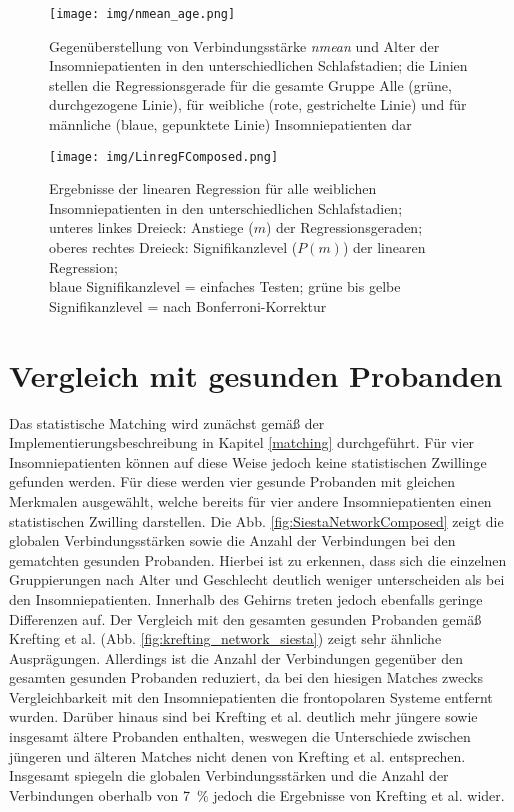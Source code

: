 \begin{figure}[H]
	\centering
	\texttt{[image: img/nmean\_age.png]}
	\caption[Gegenüberstellung von Verbindungsstärke \textit{nmean} und Alter von Insomniepatienten]{Gegenüberstellung von Verbindungsstärke \textit{nmean} und Alter der Insomniepatienten in den unterschiedlichen Schlafstadien; die Linien stellen die Regressionsgerade für die gesamte Gruppe Alle (grüne, durchgezogene Linie), für weibliche (rote, gestrichelte Linie) und für männliche (blaue, gepunktete Linie) Insomniepatienten dar}
	\label{fig:nmean_age}
\end{figure}


\begin{figure}[H]
	\centering
	\texttt{[image: img/LinregFComposed.png]}
	\caption[Ergebnisse der linearen Regression für alle weiblichen Insomniepatienten]{Ergebnisse der linearen Regression für alle weiblichen Insomniepatienten in den unterschiedlichen Schlafstadien;\\unteres linkes Dreieck: Anstiege ($m$) der Regressionsgeraden;\\oberes rechtes Dreieck: Signifikanzlevel ($P(m)$) der linearen Regression;\\blaue Signifikanzlevel = einfaches Testen; grüne bis gelbe Signifikanzlevel = nach Bonferroni-Korrektur}
	\label{fig:LinregFComposed}
\end{figure}




\section{Vergleich mit gesunden Probanden}

Das statistische Matching wird zunächst gemäß der Implementierungsbeschreibung in Kapitel \ref{matching} durchgeführt. Für vier Insomniepatienten können auf diese Weise jedoch keine statistischen Zwillinge gefunden werden. Für diese werden vier gesunde Probanden mit gleichen Merkmalen ausgewählt, welche bereits für vier andere Insomniepatienten einen statistischen Zwilling darstellen. Die Abb. \ref{fig:SiestaNetworkComposed} zeigt die globalen Verbindungsstärken sowie die Anzahl der Verbindungen bei den gematchten gesunden Probanden. Hierbei ist zu erkennen, dass sich die einzelnen Gruppierungen nach Alter und Geschlecht deutlich weniger unterscheiden als bei den Insomniepatienten. Innerhalb des Gehirns treten jedoch ebenfalls geringe Differenzen auf. Der Vergleich mit den gesamten gesunden Probanden gemäß Krefting et al. (Abb. \ref{fig:krefting_network_siesta}) zeigt sehr ähnliche Ausprägungen. Allerdings ist die Anzahl der Verbindungen gegenüber den gesamten gesunden Probanden reduziert, da bei den hiesigen Matches zwecks Vergleichbarkeit mit den Insomniepatienten die frontopolaren Systeme entfernt wurden. Darüber hinaus sind bei Krefting et al. deutlich mehr jüngere sowie insgesamt ältere Probanden enthalten, weswegen die Unterschiede zwischen jüngeren und älteren Matches nicht denen von Krefting et al. entsprechen. Insgesamt spiegeln die globalen Verbindungsstärken und die Anzahl der Verbindungen oberhalb von 7~\% jedoch die Ergebnisse von Krefting et al. wider. 

